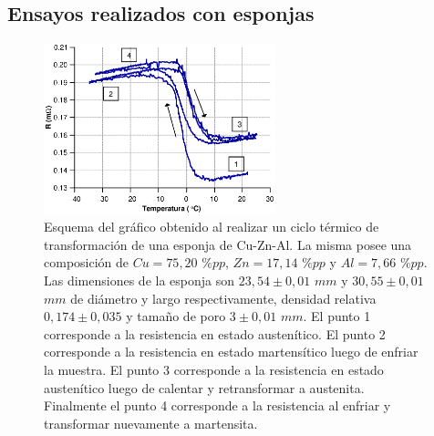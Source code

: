 \documentclass[a4paper,12pt,fleqn,twoside,openany]{book}
\begin{document}
% 
% 


% 

 
%  
  
  
\subsection{Ensayos realizados con esponjas}
 
 \begin{figure}
 \centering
 \includegraphics[width=0.6\textwidth]{Img/Resultados/Resistencia/HistExplicacion.eps}
 \caption{Esquema del gráfico obtenido al realizar un ciclo térmico de transformación de una esponja de Cu-Zn-Al. La misma posee una composición de $Cu=75,20$ $\%pp$, $Zn=17,14$ $\%pp$ y $Al=7,66$ $\%pp$. Las dimensiones de la esponja son $23,54 \pm0,01$ $mm$ y $30,55 \pm0,01$ $mm$ de diámetro y largo respectivamente, densidad relativa $0,174 \pm 0,035$ y tamaño de poro $3 \pm 0,01$ $mm$. El punto 1 corresponde a la resistencia en estado austenítico. El punto 2 corresponde a la resistencia en estado martensítico luego de enfriar la muestra. El punto 3 corresponde a la resistencia en estado austenítico luego de calentar y retransformar a austenita. Finalmente el punto 4 corresponde a la resistencia al enfriar y transformar nuevamente a martensita.} 
 \label{fig:HistExplicacion}
 \end{figure}
\end{document}
